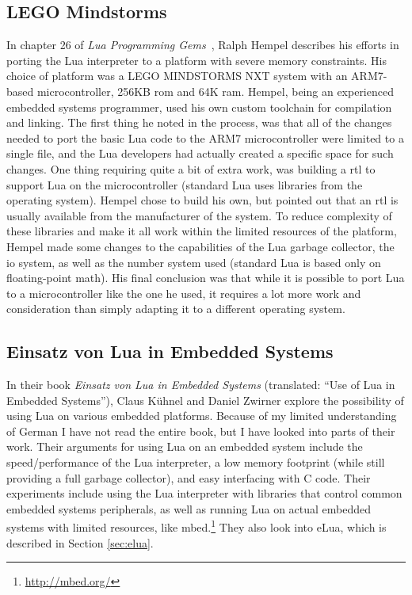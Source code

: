 \subsection{LEGO Mindstorms}
\label{sec:lego_mindstorms}
In chapter 26 of \emph{Lua Programming Gems}~\cite{chapter:porting_lua_microcontroller}, Ralph Hempel describes his efforts in porting the Lua interpreter to a platform with severe memory constraints. His choice of platform was a LEGO MINDSTORMS NXT system with an ARM7-based microcontroller, 256KB \gls{rom} and 64K \gls{ram}. Hempel, being an experienced embedded systems programmer, used his own custom toolchain for compilation and linking. The first thing he noted in the process, was that all of the changes needed to port the basic Lua code to the ARM7 microcontroller were limited to a single file, and the Lua developers had actually created a specific space for such changes. One thing requiring quite a bit of extra work, was building a \gls{rtl} to support Lua on the microcontroller (standard Lua uses libraries from the operating system). Hempel chose to build his own, but pointed out that an \gls{rtl} is usually available from the manufacturer of the system. To reduce complexity of these libraries and make it all work within the limited resources of the platform, Hempel made some changes to the capabilities of the Lua garbage collector, the \gls{io} system, as well as the number system used (standard Lua is based only on floating-point math). His final conclusion was that while it is possible to port Lua to a microcontroller like the one he used, it requires a lot more work and consideration than simply adapting it to a different operating system.

\subsection{Einsatz von Lua in Embedded Systems}
\label{sec:einsatz_von_lua_embedded}
In their book \emph{Einsatz von Lua in Embedded Systems}\cite{book:einsatz_von_lua_embedded} (translated: ``Use of Lua in Embedded Systems''), Claus Kühnel and Daniel Zwirner explore the possibility of using Lua on various embedded platforms. Because of my limited understanding of German I have not read the entire book, but I have looked into parts of their work. Their arguments for using Lua on an embedded system include the speed/performance of the Lua interpreter, a low memory footprint (while still providing a full garbage collector), and easy interfacing with C code. Their experiments include using the Lua interpreter with libraries that control common embedded systems peripherals, as well as running Lua on actual embedded systems with limited resources, like mbed.\footnote{\url{http://mbed.org/}} They also look into eLua, which is described in Section \ref{sec:elua}.


